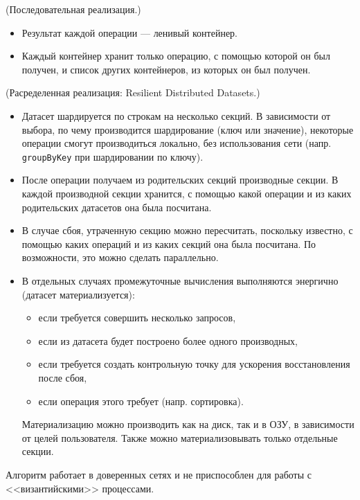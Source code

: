 \begin{algorithm}(Последовательная реализация.)
  \begin{itemize}
    \item Результат каждой операции --- ленивый контейнер.
    \item Каждый контейнер хранит только операцию, с помощью которой он был
      получен, и список других контейнеров, из которых он был получен.
  \end{itemize}
\end{algorithm}

\begin{algorithm}(Расределенная реализация: Resilient Distributed Datasets.)
  \begin{itemize}
    \item Датасет шардируется по строкам на несколько секций. В зависимости от
      выбора, по чему производится шардирование (ключ или значение), некоторые
      операции смогут производиться локально, без использования сети (напр.
      \newline \texttt{groupByKey} при шардировании по ключу).
    \item После операции получаем из родительских секций производные секции.
      В каждой производной секции хранится, с помощью какой операции и из каких
      родительских датасетов она была посчитана.
    \item В случае сбоя, утраченную секцию можно пересчитать, поскольку
      известно, с помощью каких операций и из каких секций она была посчитана.
      По возможности, это можно сделать параллельно.
    \item В отдельных случаях промежуточные вычисления выполняются энергично
      (датасет материализуется):
      \begin{itemize}
        \item если требуется совершить несколько запросов,
        \item если из датасета будет построено более одного производных,
        \item если требуется создать контрольную точку для ускорения
          восстановления после сбоя,
        \item если операция этого требует (напр. сортировка).
      \end{itemize}
      Материализацию можно производить как на диск, так и в ОЗУ, в зависимости
      от целей пользователя. Также можно материализовывать только отдельные
      секции.
  \end{itemize}
\end{algorithm}

\begin{remark} Алгоритм работает в доверенных сетях и не приспособлен для
  работы с <<византийскими>> процессами.
\end{remark}
